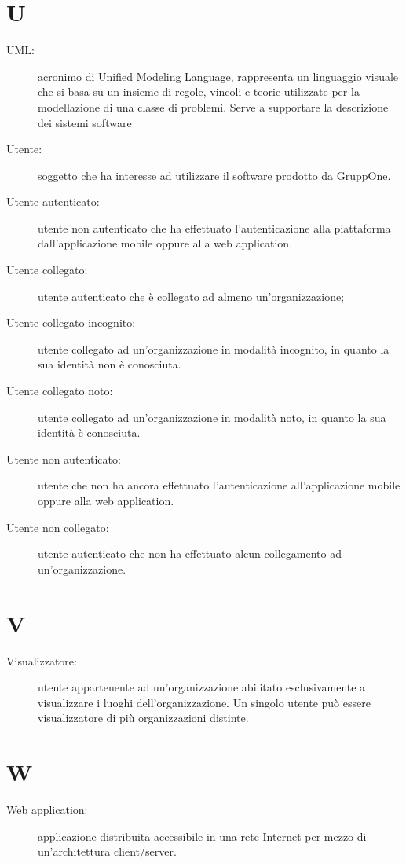 \documentclass{article}
\begin{document}
	\section{U}
	\begin{description}
		\item[UML:] acronimo di Unified Modeling Language, rappresenta un linguaggio visuale che si basa su un insieme di regole, vincoli e teorie utilizzate per la modellazione di una classe di problemi. Serve a supportare la descrizione dei sistemi software
		\item[Utente:] soggetto che ha interesse ad utilizzare il software prodotto da GruppOne.
		\item[Utente autenticato:] utente non autenticato che ha effettuato l'autenticazione alla piattaforma dall'applicazione mobile oppure alla web application.
		\item[Utente collegato:] utente autenticato che è collegato ad almeno un'organizzazione;
		\item[Utente collegato incognito:] utente collegato ad un'organizzazione in modalità incognito, in quanto la sua identità non è conosciuta.
		\item[Utente collegato noto:] utente collegato ad un'organizzazione in modalità noto, in quanto la sua identità è conosciuta.
		\item[Utente non autenticato:] utente che non ha ancora effettuato l'autenticazione all'applicazione mobile oppure alla web application.
		\item[Utente non collegato:] utente autenticato che non ha effettuato alcun collegamento ad un'organizzazione.
	\end{description}
	\newpage
	\section{V}
	\begin{description}
		\item[Visualizzatore:] utente appartenente ad un'organizzazione abilitato esclusivamente a visualizzare i luoghi dell'organizzazione. Un singolo utente può essere visualizzatore di più organizzazioni distinte.
	\end{description}
	\newpage
	\section{W}
	\begin{description}
		\item[Web application:] applicazione distribuita accessibile in una rete Internet per mezzo di un'architettura client/server.
	\end{description}
	\newpage
\end{document}
